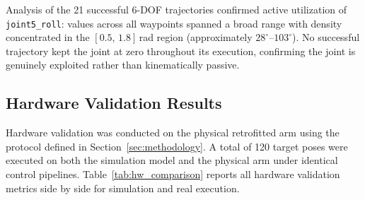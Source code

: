 \documentclass[conference]{IEEEtran}
\begin{document}
	Analysis of the 21 successful 6-DOF trajectories confirmed active
	utilization of \texttt{joint5\_roll}: values across all waypoints
	spanned a broad range with density concentrated in the
	$[0.5,\,1.8]$\,rad region (approximately $28^\circ$--$103^\circ$).
	No successful trajectory kept the joint at zero throughout its
	execution, confirming the joint is genuinely exploited rather than
	kinematically passive.
	
	\subsection{Hardware Validation Results}
	\label{sec:hw_results}
	
	Hardware validation was conducted on the physical retrofitted arm
	using the protocol defined in Section~\ref{sec:methodology}. A total
	of 120 target poses were executed on both the simulation model and the
	physical arm under identical control pipelines. Table~\ref{tab:hw_comparison}
	reports all hardware validation metrics side by side for simulation
	and real execution.
	
\end{document}
